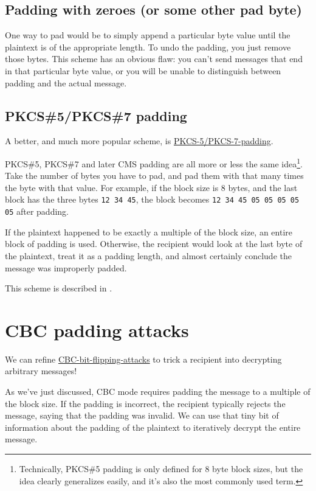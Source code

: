\documentclass[11pt,ebook,table,dvipsnames]{memoir}
\begin{document}
\subsection{Padding with zeroes (or some other pad byte)}
\label{sec-2-3-8-1}

One way to pad would be to simply append a particular byte value until
the plaintext is of the appropriate length. To undo the padding, you
just remove those bytes. This scheme has an obvious flaw: you can't
send messages that end in that particular byte value, or you will be
unable to distinguish between padding and the actual message.
\subsection{\label{PKCS-5/PKCS-7-padding}PKCS\#5/PKCS\#7 padding}
\label{sec-2-3-8-2}

A better, and much more popular scheme, is \hyperref[PKCS\#5/PKCS\#7 padding]{PKCS-5/PKCS-7-padding}.

PKCS\#5, PKCS\#7 and later CMS padding are all more or less the same
idea\footnote{Technically, PKCS\#5 padding is only defined for 8 byte block
sizes, but the idea clearly generalizes easily, and it's also the most
commonly used term.}. Take the number of bytes you have to pad, and
pad them with that many times the byte with that value. For example,
if the block size is 8 bytes, and the last block has the three bytes
\texttt{12 34 45}, the block becomes \texttt{12 34 45 05 05 05 05 05} after padding.

If the plaintext happened to be exactly a multiple of the block size,
an entire block of padding is used. Otherwise, the recipient would
look at the last byte of the plaintext, treat it as a padding length,
and almost certainly conclude the message was improperly padded.

This scheme is described in \cite{cms:padding}.
\section{CBC padding attacks}
\label{sec-2-3-9}

We can refine \hyperref[CBC bit flipping attacks]{CBC-bit-flipping-attacks} to trick a recipient into
decrypting arbitrary messages!

As we've just discussed, \gls{CBC mode} requires padding the message
to a multiple of the block size. If the padding is incorrect, the
recipient typically rejects the message, saying that the padding was
invalid. We can use that tiny bit of information about the padding of
the plaintext to iteratively decrypt the entire message.
\end{document}
